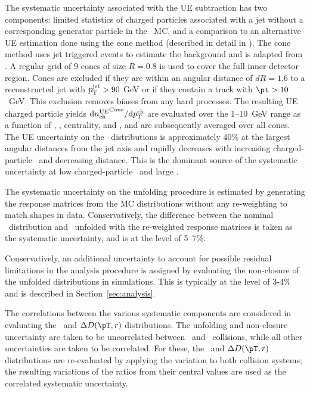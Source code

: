 The systematic uncertainty associated with the UE subtraction has two components: limited statistics of charged particles associated with a jet without a corresponding generator particle in the \pbpb\ MC, and a comparison to an alternative UE estimation done using the cone method (described in detail in \cite{Aaboud:2017bzv, PhysRevC.98.024908}). The cone method uses jet triggered events to estimate the background and is adapted from \cite{PhysRevC.98.024908}. A regular grid of 9 cones of size $R = 0.8$ is used to cover the full inner detector region. Cones are excluded if they are within an angular distance of $dR=1.6$ to a reconstructed jet with $\mbox{$p_{\mathrm{T}}^{\mathrm{jet}}$} > 90$ GeV or if they contain a track with \mbox{$\pt > 10$ GeV}. This exclusion removes biases from any hard processes. The resulting UE charged particle yields $\mathrm{d} \mbox{$n_{\mathrm{ch}}^{\mathrm{UE}}$}^{\mathrm{Cone}}/ \mathrm{d} \mbox{$p_{{\mathrm{T}}}^{\mathrm{ch}}$}$ are evaluated over the \mbox{1--10 GeV} range as a function of \pt, \ptjet, centrality, and \rvar, and are subsequently averaged over all cones. The UE uncertainty on the \Dptr\ distributions is approximately 40\% at the largest angular distances from the jet axis and rapidly decreases with increasing charged-particle \pT\ and decreasing distance. This is the dominant source of the systematic uncertainty at low charged-particle \pt\ and large \rvar.


The systematic uncertainty on the unfolding procedure is estimated by generating the response matrices from the MC distributions without any re-weighting to match shapes in data. Conservatively, the difference between the nominal \Dptr\ distribution and \Dptr\ unfolded with the re-weighted response matrices is taken as the systematic uncertainty, and is at the level of 5--7\%.

Conservatively, an additional uncertainty to account for possible residual limitations in the analysis procedure is assigned by evaluating the non-closure of the unfolded distributions in simulations. This is typically at the level of 3-4\% and is described in Section~\ref{sec:analysis}.

The correlations between the various systematic components are considered in evaluating the \RDptr\ and $\Delta\Dptr$ distributions. The unfolding and non-closure uncertainty are taken to be uncorrelated between \pp\ and \pbpb\ collisions, while all other uncertainties are taken to be correlated. For these, the \RDptr\ and $\Delta\Dptr$ distributions are re-evaluated by applying the variation to both collision systems; the resulting variations of the ratios from their central values are used as the correlated systematic uncertainty. 

